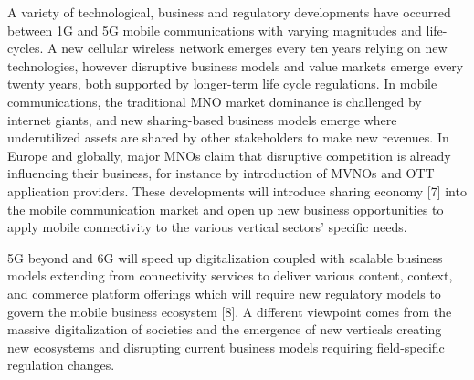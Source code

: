 \documentclass[journal,twocolumn]{IEEEtran}
\begin{document}
 A variety of technological, business and regulatory developments have occurred between 1G and 5G mobile communications with varying magnitudes and life-cycles. A new cellular wireless network emerges every ten years relying on new technologies, however disruptive business models and value markets emerge every twenty years, both supported by longer-term life cycle regulations. 
 In mobile communications, the traditional MNO market dominance is challenged by internet giants, and new sharing-based business models emerge where underutilized assets are shared by other stakeholders to make new revenues.  In Europe and globally, major MNOs claim that disruptive competition is already influencing their business, for instance by introduction of MVNOs and OTT application providers. 
 These developments will introduce sharing economy [7] into the mobile communication market and open up new business opportunities to apply mobile connectivity to the various vertical sectors’ specific needs.  
 
 5G beyond and 6G will speed up digitalization coupled with scalable business models extending from connectivity services to deliver various content, context, and commerce platform offerings which will require new regulatory models to govern the mobile business ecosystem [8]. A different viewpoint comes from the massive digitalization of societies and the emergence of new verticals creating new ecosystems and disrupting current business models requiring field-specific regulation changes. 
 
\end{document}
